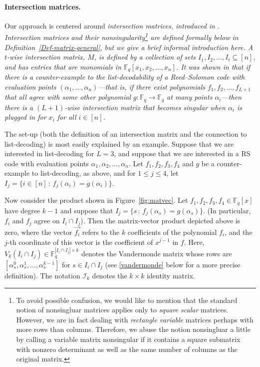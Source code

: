 \documentclass[11pt]{article}
\newcommand\black[1]{{\color{black} #1}}
\begin{document}
\paragraph{Intersection matrices.}
Our approach is centered around \em intersection matrices, \em introduced in \cite{shangguan2019combinatorial0}.  Intersection matrices and their nonsingularity\footnote{To avoid possible confusion, we would like to mention that the standard notion of nonsingluar matrices applies only to {\it square scalar} matrices. However, we are in fact dealing with {\it rectangle variable} matrices perhaps with more rows than columns. Therefore, we abuse the notion nonsingluar a little by calling a variable matrix nonsingular if it contains a square submatrix with nonzero determinant as well as the same number of columns as the original matrix.} are defined formally below in Definition~\ref{Def-matrix-general}, but we give a brief informal introduction here.  A $t$-wise intersection matrix, $M$, is defined by a collection of sets $I_1, I_2, \ldots, I_t \subseteq [n]$, and has entries that are monomials in $\mathbb{F}_q[x_1, x_2, \ldots, x_n]$. It was shown in \cite{shangguan2019combinatorial0} that if there is a counter-example to the list-decodability of a Reed--Solomon code with evaluation points $(\alpha_1, \ldots, \alpha_n)$---that is, if there exist polynomials $f_1, f_2, \ldots, f_{L+1}$ that all agree with some other polynomial $g: \mathbb{F}_q \to \mathbb{F}_q$ at many points $\alpha_i$---then there is a $(L+1)$-wise intersection matrix that becomes singular when $\alpha_i$ is plugged in for $x_i$ for all $i \in [n]$.

The set-up (both the definition of an intersection matrix and the connection to list-decoding) is most easily explained by an example.  Suppose that we are interested in list-decoding for $L=3$, and suppose that we are interested in a RS code with evaluation points $\alpha_1, \alpha_2, \ldots, \alpha_n$.  Let $f_1, f_2, f_3, f_4$ and $g$ be a counter-example to list-decoding, as above, and for $1\le j\le 4$, let $I_j = \{ i\in [n] \,:\, f_j(\alpha_i) = g(\alpha_i)\}$.

Now consider the product shown in Figure~\ref{fig:matvec}. \black{Let $f_1, f_2, f_3, f_4 \in \mathbb{F}_q[x]$ have degree $k-1$ and suppose that $I_j = \{ s \,:\, f_j(\alpha_s) = g(\alpha_s) \}$.  (In particular, $f_i$ and $f_j$ agree on $I_i \cap I_j$).  Then the matrix-vector product depicted above is zero, where the vector $\vec{f_i}$ refers to the $k$ coefficients of the polynomial $f_i$, and the $j$-th coordinate of this vector is the coefficient of $x^{j-1}$ in $f$.
Here, $V_k(I_i\cap I_j) \in \mathbb{F}_q^{|I_i\cap I_j|\times k}$ denotes the Vandermonde matrix whose rows are $[\alpha_s^0,\alpha_s^1,\dots,\alpha_s^{k-1}]$ for $s\in I_i\cap I_j$ (see \eqref{vandermonde} below for a more precise definition).
The notation $\mathcal{I}_k$ denotes the $k\times k$ identity matrix.}
\end{document}
